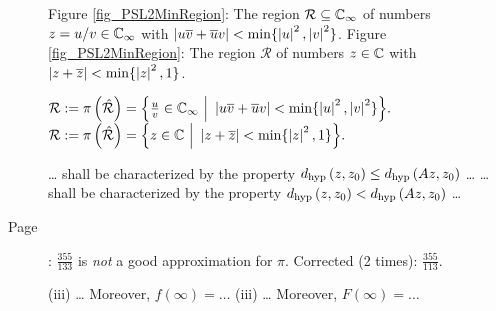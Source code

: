 \begin{description}
{Figure \ref{fig_PSL2MinRegion}: The region $\mathcal{R} \subseteq \mathbb{C}_{\infty}$ of numbers $z = u/v \in \mathbb{C}_{\infty}$ with $\left|u\overline{v} + \overline{u}v\right| < \min\{\left|u\right|^2,\left|v\right|^2\}$.}
{Figure \ref{fig_PSL2MinRegion}: The region $\mathcal{R}$ of numbers $z \in \mathbb{C}$ with $\left|z + \overline{z}\right| < \min\{\left|z\right|^2, 1\}$.}

{$\mathcal{R} := \pi\left(\hat{\mathcal{R}}\right) = 
\Big\{ \frac{u}{v} \in \mathbb{C}_{\infty} \ \Big| \ \left|u\overline{v} + \overline{u}v\right| < \min\{\left|u\right|^2, \left|v\right|^2\} \Big\}.$}
{$\mathcal{R} := \pi\left(\hat{\mathcal{R}}\right) = 
\Big\{ z \in \mathbb{C} \ \Big| \ \left|z + \overline{z}\right| < \min\{\left|z\right|^2, 1\} \Big\}.$}

{\dots{} shall be characterized by the property $d_\text{hyp}\left({z},{z_0}\right) \le d_\text{hyp}\left({Az},{z_0}\right)$ \dots}
{\dots{} shall be characterized by the property $d_\text{hyp}\left({z},{z_0}\right) < d_\text{hyp}\left({Az},{z_0}\right)$ \dots}

\item[Page \pageref{err_PiApprox}]: $\frac{355}{133}$ is \emph{not} a good approximation for $\pi$. Corrected (2 times): $\frac{355}{113}$.

{(iii) \dots{} Moreover, \quad $f(\infty) = \dots$}
{(iii) \dots{} Moreover, \quad $F(\infty) = \dots$}

\end{description}
